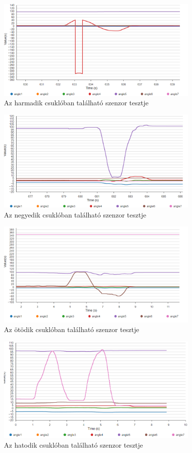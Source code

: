 \begin{figure}[!ht]
\centering
\includegraphics[width=100mm, keepaspectratio]{figures/Csuklo_szog_teszt/4}
\caption{Az harmadik csuklóban található szenzor tesztje}
\label{fig:csuklo_teszt_4}
\end{figure}

\begin{figure}[!ht]
\centering
\includegraphics[width=100mm, keepaspectratio]{figures/Csuklo_szog_teszt/5}
\caption{Az negyedik csuklóban található szenzor tesztje}
\label{fig:csuklo_teszt_5}
\end{figure}

\begin{figure}[!ht]
\centering
\includegraphics[width=100mm, keepaspectratio]{figures/Csuklo_szog_teszt/6}
\caption{Az ötödik csuklóban található szenzor tesztje}
\label{fig:csuklo_teszt_6}
\end{figure}

\begin{figure}[!ht]
\centering
\includegraphics[width=100mm, keepaspectratio]{figures/Csuklo_szog_teszt/7}
\caption{Az hatodik csuklóban található szenzor tesztje}
\label{fig:csuklo_teszt_7}
\end{figure}


